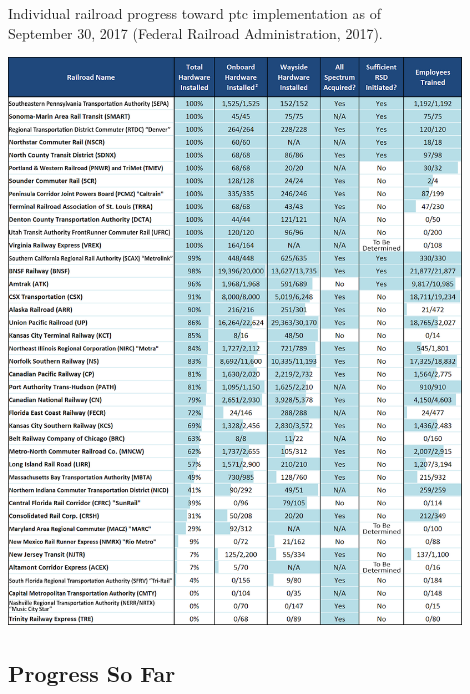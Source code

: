 \documentclass[11pt, titlepage]{article}
\begin{document}
\begin{table}[ht]
    \begin{center}
        \captionsetup{justification=centering}
        \caption[Individual PTC implementation Progress]{Individual railroad progress
        toward \gls{ptc} implementation as of\\
        September 30, 2017 (Federal Railroad Administration, 2017).}
        \includegraphics[width=0.9\textwidth]{RailroadProgressTable.png}
        \label{progress}
    \end{center}
\end{table}

\clearpage
\pagebreak

\subsection{Progress So Far}
\end{document}

